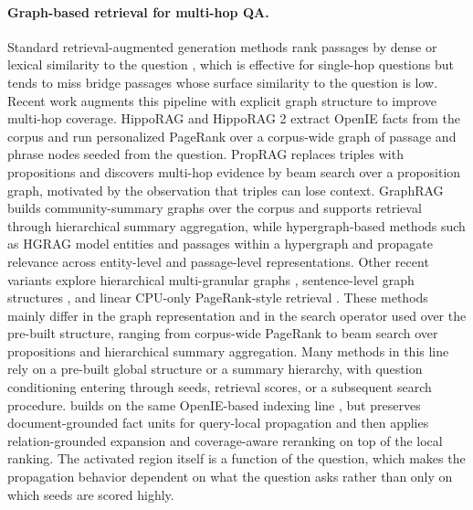 \paragraph{Graph-based retrieval for multi-hop QA.}
Standard retrieval-augmented generation methods rank passages by dense
or lexical similarity to the question
\citep{karpukhin2020dpr,robertson2009bm25}, which is effective for
single-hop questions but tends to miss bridge passages whose surface
similarity to the question is low. Recent work augments this pipeline
with explicit graph structure to improve multi-hop coverage.
HippoRAG \citep{jimenez2024hipporag} and HippoRAG 2
\citep{gutierrez2025hipporag} extract OpenIE facts from the corpus and
run personalized PageRank over a corpus-wide graph of passage and
phrase nodes seeded from the question. PropRAG \citep{wang2025proprag}
replaces triples with propositions and discovers multi-hop evidence by
beam search over a proposition graph, motivated by the observation that
triples can lose context. GraphRAG \citep{edge2024graphrag} builds
community-summary graphs over the corpus and supports retrieval through
hierarchical summary aggregation, while hypergraph-based methods such
as HGRAG \citep{hgrag2024} model entities and passages within a
hypergraph and propagate relevance across entity-level and
passage-level representations. Other recent variants explore
hierarchical multi-granular graphs \citep{hu2026mgrangrag},
sentence-level graph structures \citep{liang2026sentgraph}, and
linear CPU-only PageRank-style retrieval \citep{wang2026sprig}.
These methods mainly differ in the graph representation and in the
search operator used over the pre-built structure, ranging from
corpus-wide PageRank to beam search over propositions and hierarchical
summary aggregation. Many methods in this line rely on a pre-built
global structure or a summary hierarchy, with question conditioning
entering through seeds, retrieval scores, or a subsequent search
procedure. \methodname{} builds on the same OpenIE-based indexing line
\citep{angeli2015leveraging,gutierrez2025hipporag}, but preserves
document-grounded fact units for query-local propagation and then
applies relation-grounded expansion and coverage-aware reranking on top
of the local ranking. The activated region itself is a function of the
question, which makes the propagation behavior dependent on what the
question asks rather than only on which seeds are scored highly.

